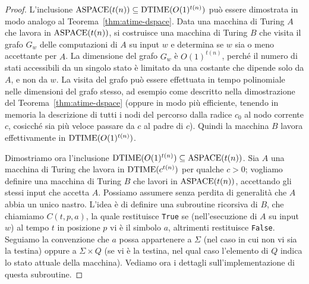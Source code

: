 \begin{proof}
  L'inclusione $\operatorname{ASPACE}(t(n)) \subseteq \operatorname{DTIME}(O(1)^{t(n)})$ può essere dimostrata in modo analogo al
  Teorema~\ref{thm:atime-dspace}. Data una macchina di Turing $A$ che lavora in $\operatorname{ASPACE}(t(n))$,
  si costruisce una macchina di Turing $B$ che visita il grafo $G_w$ delle computazioni di $A$ su input $w$
  e determina se $w$ sia o meno accettante per $A$. La dimensione del grafo $G_w$ è $O(1)^{t(n)}$,
  perché il numero di stati accessibili da un singolo stato è limitato da una costante che dipende
  solo da $A$, e non da $w$.
  La visita del grafo può essere effettuata in tempo polinomiale nelle dimensioni del grafo stesso, ad esempio
  come descritto nella dimostrazione del Teorema~\ref{thm:atime-dspace} (oppure in modo più efficiente,
  tenendo in memoria la descrizione di tutti i nodi del percorso dalla radice $c_0$ al nodo corrente $c$,
  cosicché sia più veloce passare da $c$ al padre di $c$).
  Quindi la macchina $B$ lavora effettivamente in $\operatorname{DTIME}(O(1)^{t(n)})$.
  
  Dimostriamo ora l'inclusione $\operatorname{DTIME}(O(1)^{t(n)}) \subseteq \operatorname{ASPACE}(t(n))$.
  Sia $A$ una macchina di Turing che lavora in $\operatorname{DTIME}(c^{t(n)})$ per qualche $c>0$; vogliamo definire una macchina di Turing $B$ che lavori in $\operatorname{ASPACE}(t(n))$, accettando gli stessi input che accetta $A$.
  Possiamo assumere senza perdita di generalità che $A$ abbia un unico nastro.
  L'idea è di definire una subroutine ricorsiva di $B$, che chiamiamo $C(t,p,a)$, la quale restituisce \texttt{True} se (nell'esecuzione di $A$ su input $w$) al tempo $t$ in posizione $p$ vi è il simbolo $a$, altrimenti restituisce \texttt{False}.
  Seguiamo la convenzione che $a$ possa appartenere a $\Sigma$ (nel caso in cui non vi sia la testina) oppure a $\Sigma\times Q$ (se vi è la testina, nel qual caso l'elemento di $Q$ indica lo stato attuale della macchina). Vediamo ora i dettagli sull'implementazione di questa subroutine.
  

\end{proof}
